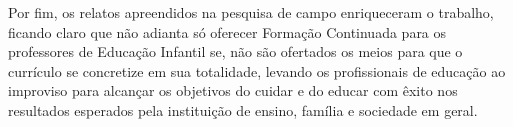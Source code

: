 \begin{refsection}
    Por fim, os relatos apreendidos na pesquisa de campo enriqueceram o trabalho, ficando claro que não adianta só oferecer Formação Continuada para os professores de Educação Infantil se, não são ofertados os meios para que o currículo se concretize em sua totalidade, levando os profissionais de educação ao improviso para alcançar os objetivos do cuidar e do educar com êxito nos resultados esperados pela instituição de ensino, família e sociedade em geral. 

    \nocite{ConstituiçãoBrasil1988}
    \nocite{Parecer15-2017}
    \nocite{PNE2014}
    \nocite{PASCHOALAndMACHADO2009história}

    \printbibliography[heading=subbibliography,notcategory=fullcited]

    \label{chap:curriculo-ed-infantend}

\end{refsection}
